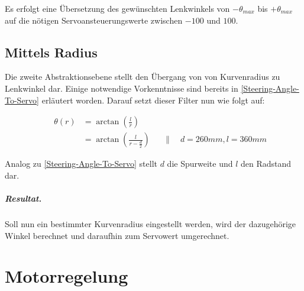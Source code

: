 \documentclass[a4paper,12pt]{report}
\begin{document}
	Es erfolgt eine Übersetzung des gewünschten Lenkwinkels von $-\theta_{max}$ bis $+\theta_{max}$ auf die nötigen Servoansteuerungswerte zwischen $-100$ und $100$.

\section{Mittels Radius}

	Die zweite Abstraktionsebene stellt den Übergang von von Kurvenradius zu Lenkwinkel dar.
	Einige notwendige Vorkenntnisse sind bereits in \autoref{Steering-Angle-To-Servo} erläutert worden.
	Darauf setzt dieser Filter nun wie folgt auf:

		\begin{align*}
		&&\theta\left(r\right) &= \arctan\left( \frac{l}{r} \right)\\
		&&&= \arctan\left( \frac{l}{r - \frac{d}{2}} \right) &&\|\quad d = 260mm, l = 360mm
		\end{align*}

	Analog zu \autoref{Steering-Angle-To-Servo} stellt $d$ die Spurweite und $l$ den Radstand dar.

	\paragraph{Resultat.}
	Soll nun ein bestimmter Kurvenradius eingestellt werden, wird der dazugehörige Winkel berechnet und daraufhin zum Servowert umgerechnet.


\chapter{Motorregelung}

\end{document}
